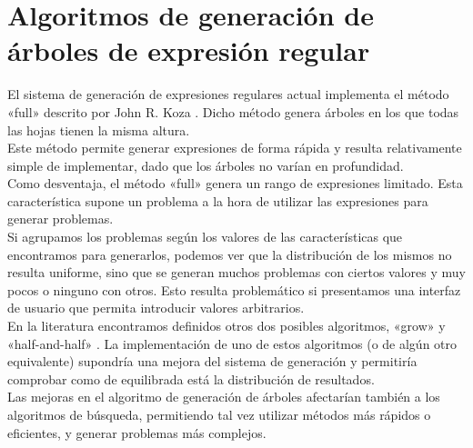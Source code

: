 
\section{Algoritmos de generación de árboles de expresión regular}
El sistema de generación de expresiones regulares actual implementa el método «full» descrito por John R. Koza \cite{koza92}.
Dicho método genera árboles en los que todas las hojas tienen la misma altura.
\\
Este método permite generar expresiones de forma rápida y resulta relativamente simple de implementar, dado que los árboles no varían en profundidad.
\\
Como desventaja, el método «full» genera un rango de expresiones limitado.
Esta característica supone un problema a la hora de utilizar las expresiones para generar problemas.
\\
Si agrupamos los problemas según los valores de las características que encontramos para generarlos, podemos ver que la distribución de los mismos no resulta uniforme, sino que se generan muchos problemas con ciertos valores y muy pocos o ninguno con otros.
Esto resulta problemático si presentamos una interfaz de usuario que permita introducir valores arbitrarios.
\\
En la literatura encontramos definidos otros dos posibles algoritmos, «grow» y «half-and-half» \cite{koza92}.
La implementación de uno de estos algoritmos (o de algún otro equivalente) supondría una mejora del sistema de generación y permitiría comprobar como de equilibrada está la distribución de resultados.
\\
Las mejoras en el algoritmo de generación de árboles afectarían también a los algoritmos de búsqueda, permitiendo tal vez utilizar métodos más rápidos o eficientes, y generar problemas más complejos.